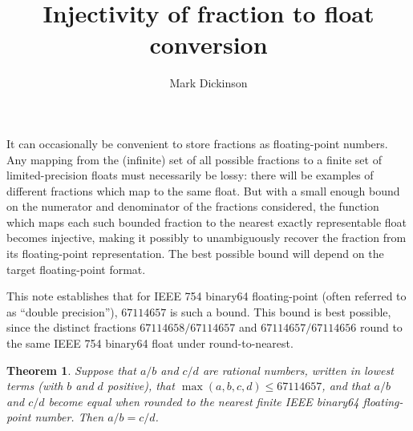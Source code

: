 \documentclass[a4paper]{article}
\title{Injectivity of fraction to float conversion}
\author{Mark Dickinson}
\theoremstyle{plain}
\newtheorem{theorem}{Theorem}
\begin{document}
\maketitle

It can occasionally be convenient to store fractions as floating-point numbers.
Any mapping from the (infinite) set of all possible fractions to a finite set
of limited-precision floats must necessarily be lossy: there will be examples
of different fractions which map to the same float. But with a small enough
bound on the numerator and denominator of the fractions considered, the
function which maps each such bounded fraction to the nearest exactly
representable float becomes injective, making it possibly to unambiguously
recover the fraction from its floating-point representation. The best possible
bound will depend on the target floating-point format.

This note establishes that for IEEE 754 binary64 floating-point (often referred
to as ``double precision''), $67114657$ is such a bound. This bound is best
possible, since the distinct fractions $67114658 / 67114657$ and $67114657 /
67114656$ round to the same IEEE 754 binary64 float under round-to-nearest.

\begin{theorem}
    Suppose that $a/b$ and $c/d$ are rational numbers, written in lowest terms
    (with $b$ and $d$ positive), that $\max(a, b, c, d) \le 67114657$, and that
    $a/b$ and $c/d$ become equal when rounded to the nearest finite IEEE
    binary64 floating-point number. Then $a/b = c/d$.
\end{theorem}
\end{document}

